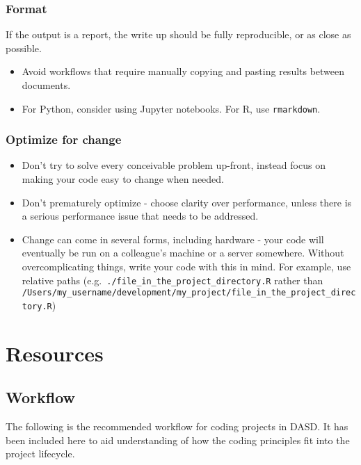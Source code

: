 \documentclass[]{book}
\providecommand{\tightlist}{%
  \setlength{\itemsep}{0pt}\setlength{\parskip}{0pt}}
\begin{document}
\hypertarget{format}{%
\section{Format}\label{format}}

If the output is a report, the write up should be fully reproducible, or as close as possible.

\begin{itemize}
\tightlist
\item
  Avoid workflows that require manually copying and pasting results between documents.\\
\item
  For Python, consider using Jupyter notebooks. For R, use \texttt{rmarkdown}.
\end{itemize}

\hypertarget{change}{%
\section{Optimize for change}\label{change}}

\begin{itemize}
\tightlist
\item
  Don't try to solve every conceivable problem up-front, instead focus on making your code easy to change when needed.
\item
  Don't prematurely optimize - choose clarity over performance, unless there is a serious performance issue that needs to be addressed.
\item
  Change can come in several forms, including hardware - your code will eventually be run on a colleague's machine or a server somewhere. Without overcomplicating things, write your code with this in mind. For example, use relative paths (e.g.~\texttt{./file\_in\_the\_project\_directory.R} rather than \texttt{/Users/my\_username/development/my\_project/file\_in\_the\_project\_directory.R})
\end{itemize}

\hypertarget{part-resources}{%
\part{Resources}\label{part-resources}}

\hypertarget{wf}{%
\chapter{Workflow}\label{wf}}

The following is the recommended workflow for coding projects in DASD. It has been included here to aid understanding of how the coding principles fit into the project lifecycle.
\end{document}
